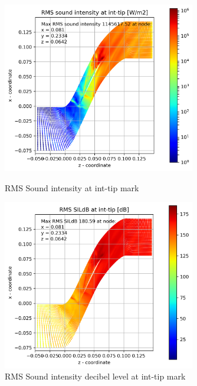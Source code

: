 \begin{figure}[ht]
  \centering
  \includegraphics[width=0.75\textwidth]{Figures/int-tip-rms-sil.png} 
  \caption{RMS Sound intensity at int-tip mark} \label{int-tip-rms-sil}
  
  \vspace*{\floatsep}%

  \includegraphics[width=0.75\textwidth]{Figures/int-tip-rms-sildb.png} 
  \caption{RMS Sound intensity decibel level at int-tip mark} \label{int-tip-rms-sildb}
\end{figure}